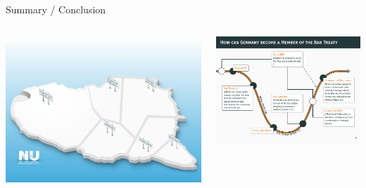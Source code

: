 \documentclass[presentation]{beamer}
\begin{document}
\begin{frame}[label={sec:org801d08c}]{Summary / Conclusion}
\begin{columns}[T]
\begin{column}{0.3\columnwidth}
\begin{tcolorbox}
\includegraphics[width=\textwidth]{localimages/cc/nu/germany/germany-goal.png}
\end{tcolorbox}
\end{column}

\begin{column}{0.3\columnwidth}
\begin{tcolorbox}
\includegraphics[width=\textwidth]{process}
\end{tcolorbox}
\end{column}




\end{columns}
\end{frame}
\end{document}
